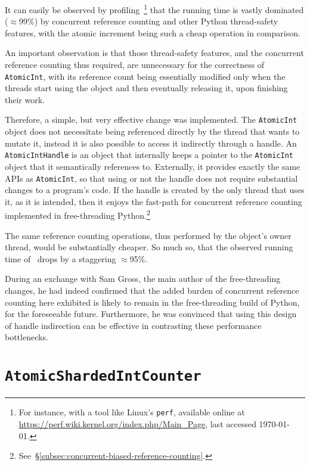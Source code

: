 It can easily be observed by profiling~\cite[examples/atomic_int/counter.py]{cereggii}\footnote{%
    For instance, with a tool like Linux's \texttt{perf}, available online at \url{https://perf.wiki.kernel.org/index.php/Main_Page}, last accessed \today.
} that the running time is vastly dominated ($\approx$99\%) by concurrent reference counting and other Python thread-safety features, with the atomic increment being such a cheap operation in comparison.

An important observation is that those thread-safety features, and the concurrent reference counting thus required, are unnecessary for the correctness of \texttt{AtomicInt}, with its reference count being essentially modified only when the threads start using the object and then eventually releasing it, upon finishing their work.

Therefore, a simple, but very effective change was implemented.
The \texttt{AtomicInt} object does not necessitate being referenced directly by the thread that wants to mutate it, instead it is also possible to access it indirectly through a handle.
An \texttt{AtomicIntHandle} is an object that internally keeps a pointer to the \texttt{AtomicInt} object that it semantically references to.
Externally, it provides exactly the same APIs as \texttt{AtomicInt}, so that using or not the handle does not require substantial changes to a program's code.
If the handle is created by the only thread that uses it, as it is intended, then it enjoys the fast-path for concurrent reference counting implemented in free-threading Python.\footnote{%
    See~\S\ref{subsec:concurrent-biased-reference-counting}.
}

The same reference counting operations, thus performed by the object's owner thread, would be substantially cheaper.
So much so, that the observed running time of~\cite[examples/atomic_int/counter.py]{cereggii} drops by a staggering $\approx$95\%.

During an exchange with Sam Gross, the main author of the free-threading changes, he had indeed confirmed that the added burden of concurrent reference counting here exhibited is likely to remain in the free-threading build of Python, for the foreseeable future.
Furthermore, he was convinced that using this design of handle indirection can be effective in contrasting these performance bottlenecks.


\section{\texttt{AtomicShardedIntCounter}}\label{sec:atomicshardedintcounter}

